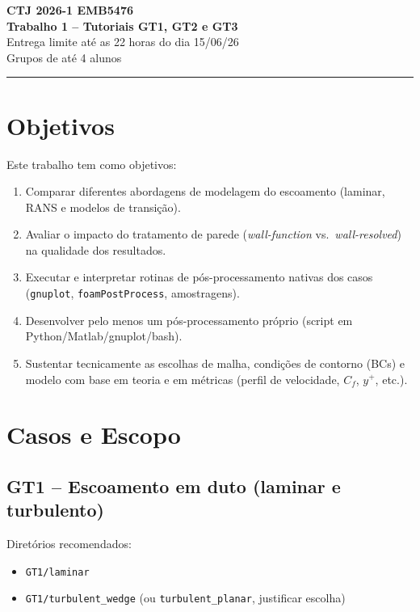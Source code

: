\documentclass[12pt,a4paper]{article}
\begin{document}
\begin{center}
  {\large\bfseries CTJ 2026-1 \quad EMB5476}\\[0.5em]
  {\large\bfseries Trabalho 1 -- Tutoriais GT1, GT2 e GT3}\\[0.3em]
  {\normalsize Entrega limite até as 22 horas do dia 15/06/26}\\[0.2em]
  {\normalsize Grupos de até 4 alunos}
\end{center}

\vspace{1em}
\hrule
\vspace{1em}

\section{Objetivos}

Este trabalho tem como objetivos:

\begin{enumerate}
  \item Comparar diferentes abordagens de modelagem do escoamento (laminar, RANS e modelos de transição).
  \item Avaliar o impacto do tratamento de parede (\textit{wall-function} vs.\ \textit{wall-resolved}) na qualidade dos resultados.
  \item Executar e interpretar rotinas de pós-processamento nativas dos casos (\texttt{gnuplot}, \texttt{foamPostProcess}, amostragens).
  \item Desenvolver pelo menos um pós-processamento próprio (script em Python/Matlab/gnuplot/bash).
  \item Sustentar tecnicamente as escolhas de malha, condições de contorno (BCs) e modelo com base em teoria e em métricas (perfil de velocidade, $C_f$, $y^+$, etc.).
\end{enumerate}

\section{Casos e Escopo}

\subsection*{GT1 -- Escoamento em duto (laminar e turbulento)}

Diretórios recomendados:
\begin{itemize}
  \item \texttt{GT1/laminar}
  \item \texttt{GT1/turbulent\_wedge} (ou \texttt{turbulent\_planar}, justificar escolha)
\end{itemize}
\end{document}
